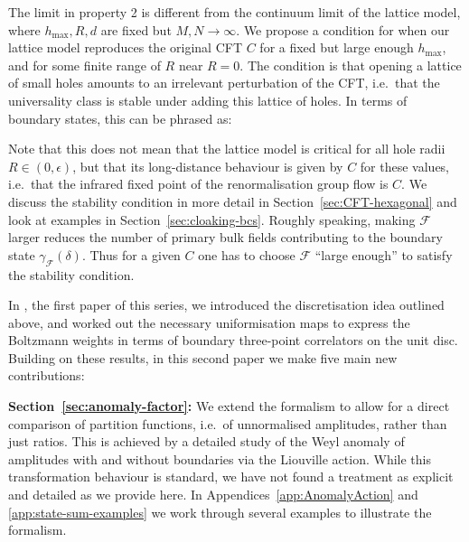 \documentclass[11pt,a4paper]{article}
\numberwithin{equation}{section}
\begin{document}
\smallskip
The limit in property 2 is different from the continuum limit of the lattice model, where $h_\text{max}, R, d$ are fixed but $M,N \to \infty$. We propose a condition for when our lattice model reproduces the original CFT $C$ for a fixed but large enough $h_\text{max}$, and for some finite range of $R$ near $R=0$. The condition is that opening a lattice of small holes amounts to an irrelevant perturbation of the CFT, i.e.\ that the universality class is stable under adding this lattice of holes. In terms of boundary states, this can be phrased as:
%
\begin{center}
\end{center}
%
Note that this does not mean that the lattice model is critical for all hole radii $R \in (0,\epsilon)$, but that its long-distance behaviour is given by $C$ for these values, i.e.\ that the infrared fixed point of the renormalisation group flow is $C$.
We discuss the stability condition in more detail in Section~\ref{sec:CFT-hexagonal} and look at examples in Section~\ref{sec:cloaking-bcs}. Roughly speaking, making $\mathcal{F}$ larger reduces the number of primary bulk fields contributing to the boundary state $\gamma_\mathcal{F}(\delta)$. Thus for a given $C$ one has to choose $\mathcal{F}$ ``large enough'' to satisfy the stability condition.

\medskip

In \cite{Brehm:2021wev}, the first paper of this series, we introduced the discretisation idea outlined above, and worked out the necessary uniformisation maps to express the Boltzmann weights in terms of boundary three-point correlators on the unit disc. 
Building on these results, in this second paper we make five main new contributions:

\smallskip

\noindent
\textbf{Section~\ref{sec:anomaly-factor}:}
We extend the formalism to allow for a direct comparison of partition functions, i.e.\ of unnormalised amplitudes, rather than just ratios. This is achieved by a detailed study of the Weyl anomaly of amplitudes with and without boundaries via the Liouville action. While this transformation behaviour is standard, we have not found a treatment as explicit and detailed as we provide here. In Appendices~\ref{app:AnomalyAction} and \ref{app:state-sum-examples} we work through several examples to illustrate the formalism.
\end{document}
